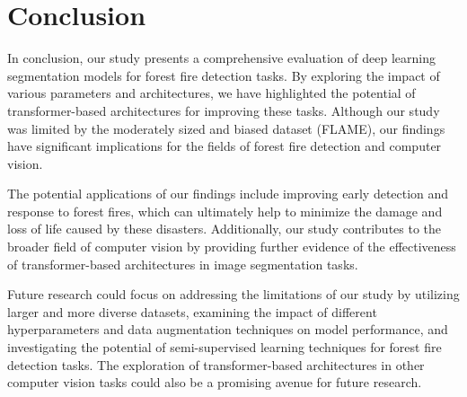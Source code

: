 \section{Conclusion}

In conclusion, our study presents a comprehensive evaluation of deep learning segmentation models for forest fire detection tasks. By exploring the impact of various parameters and architectures, we have  highlighted the potential of transformer-based architectures for improving these tasks. Although our study was limited by the moderately sized and biased dataset (FLAME), our findings have significant implications for the fields of forest fire detection and computer vision. 

The potential applications of our findings include improving early detection and response to forest fires, which can ultimately help to minimize the damage and loss of life caused by these disasters. Additionally, our study contributes to the broader field of computer vision by providing further evidence of the effectiveness of transformer-based architectures in image segmentation tasks. 

Future research could focus on addressing the limitations of our study by utilizing larger and more diverse datasets, examining the impact of different hyperparameters and data augmentation techniques on model performance, and investigating the potential of semi-supervised learning techniques for forest fire detection tasks. The exploration of transformer-based architectures in other computer vision tasks could also be a promising avenue for future research.
